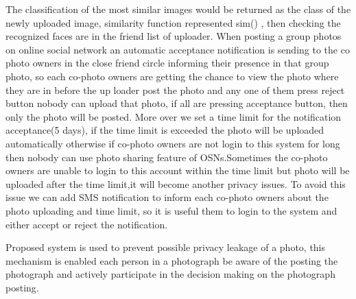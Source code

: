   \vspace*{1pc}
The classification of the most similar images would be returned as the class of the newly uploaded image, similarity function represented sim() , then checking  the recognized faces are in  the friend list of uploader. When posting a group photos on online social network an automatic acceptance notification is sending to the co photo owners in the close friend circle  informing their presence in that group photo, so each co-photo owners are getting the chance to view the photo where they are in before the up loader post the photo and any one of them press reject button nobody can upload that photo, if all are pressing acceptance button, then only the photo will be posted. More over we set a time limit for the notification acceptance(5 days),  if the time limit is exceeded the photo will be uploaded automatically otherwise if co-photo owners are not login to this system for long then nobody can use photo sharing feature of OSNs.Sometimes the co-photo owners are unable to login to this account within the time limit but photo will be uploaded after the time limit,it will become another privacy issues. To avoid this issue we can add SMS notification  to inform each co-photo owners about the photo uploading and time limit, so it is useful them to login to the system and either accept or reject the notification.

  \vspace*{1pc}
Proposed system is used to prevent possible privacy leakage of a photo, this mechanism is enabled each person in a photograph be aware of the posting the photograph and actively participate in the decision making on the photograph posting.
\clearpage
